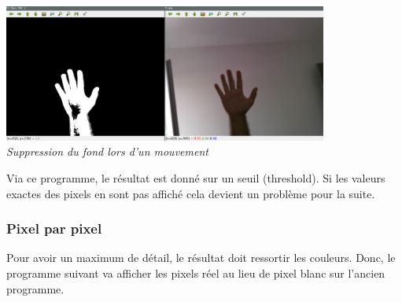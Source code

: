 \documentclass[12pt, french]{report}
\begin{document}
    \begin{center}
        \includegraphics[width=0.8\textwidth]{Images/BGSub/BGSub1.png}\\
        \textit{Suppression du fond lors d'un mouvement}\\
    \end{center}    
    
    Via ce programme, le résultat est donné sur un seuil (threshold). Si les valeurs exactes des pixels en sont pas affiché cela devient un problème pour la suite. 
    
    \subsubsection{Pixel par pixel}
    Pour avoir un maximum de détail, le résultat doit ressortir les couleurs. Donc, le programme suivant va afficher les pixels réel au lieu de pixel blanc sur l'ancien programme.
    
\end{document}

